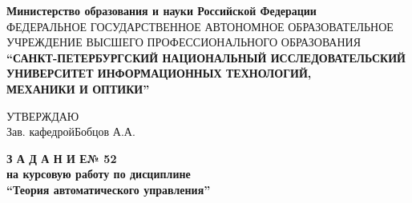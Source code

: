 \documentclass[fleqn, a4paper, 12pt, russian]{article}
\begin{document}
	\centering
	{\fontsize{14pt}{5cm}\selectfont \bfseries Министерство образования и науки Российской Федерации} \\ \vspace{0.5cm}
	{\fontsize{6.8pt}{5cm}\selectfont ФЕДЕРАЛЬНОЕ ГОСУДАРСТВЕННОЕ АВТОНОМНОЕ ОБРАЗОВАТЕЛЬНОЕ УЧРЕЖДЕНИЕ ВЫСШЕГО ПРОФЕССИОНАЛЬНОГО ОБРАЗОВАНИЯ} \\ 
	\vspace{0.5cm}
	{\fontsize{13pt}{5cm}\selectfont \bfseries “САНКТ-ПЕТЕРБУРГСКИЙ НАЦИОНАЛЬНЫЙ ИССЛЕДОВАТЕЛЬСКИЙ УНИВЕРСИТЕТ ИНФОРМАЦИОННЫХ ТЕХНОЛОГИЙ,} \\ \vspace{0.1cm}
	{\fontsize{13pt}{5cm}\selectfont \bfseries МЕХАНИКИ И ОПТИКИ”} \\ \vspace{1cm}
	
	\flushleft
	{\fontsize{12pt}{0cm} \hspace{1.6cm}УТВЕРЖДАЮ} \\ \vspace{0.1cm}
	{\fontsize{12pt}{0cm}\selectfont \hspace{10.5cm}Зав. кафедрой\hspace{0.6cm}Бобцов А.А.} \\ \vspace{1cm}
	
	\centering
	{\fontsize{18pt}{0cm}\selectfont \bfseries З А Д А Н И Е\hspace{0.2cm}№ 52}\\ \vspace{0.2cm}
	{\fontsize{16pt}{0cm}\selectfont \bfseries на курсовую работу по дисциплине}	\\ \vspace{0.2cm}
	{\fontsize{16pt}{0cm}\selectfont \bfseries \enquote{Теория автоматического управления}} \\ \vspace{1cm}
	
\end{document}
